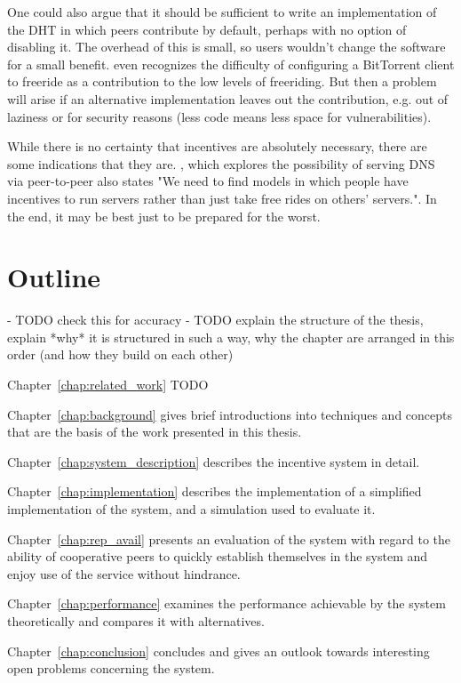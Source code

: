 One could also argue that it should be sufficient to write an implementation of
the \ac{DHT} in which peers contribute by default, perhaps with no option of
disabling it. The overhead of this is small, so users wouldn't change the
software for a small benefit. \cite{ripeanu2006gifting} even recognizes the
difficulty of configuring a BitTorrent client to freeride as a contribution to
the low levels of freeriding. But then a problem will arise if an alternative
implementation leaves out the contribution, e.g. out of laziness or for security
reasons (less code means less space for vulnerabilities).

While there is no certainty that incentives are absolutely necessary, there are
some indications that they are. \cite{cox2002serving}, which explores the
possibility of serving DNS via peer-to-peer also states "We need to find models
in which people have incentives to run servers rather than just take free rides
on others’ servers.". In the end, it may be best just to be prepared for the
worst.

\section{Outline}
- TODO check this for accuracy
- TODO explain the structure of the thesis, explain *why* it is structured in
  such a way, why the chapter are arranged in this order (and how they build on
  each other)

Chapter~\ref{chap:related_work} TODO

Chapter~\ref{chap:background} gives brief introductions into techniques and
concepts that are the basis of the work presented in this thesis.

Chapter~\ref{chap:system_description} describes the incentive system in detail.

Chapter~\ref{chap:implementation} describes the implementation of a simplified
implementation of the system, and a simulation used to evaluate it.

Chapter~\ref{chap:rep_avail} presents an evaluation of the system with regard to
the ability of cooperative peers to quickly establish themselves in the system
and enjoy use of the service without hindrance.

Chapter~\ref{chap:performance} examines the performance achievable by the system
theoretically and compares it with alternatives.

Chapter~\ref{chap:conclusion} concludes and gives an outlook towards interesting
open problems concerning the system.

